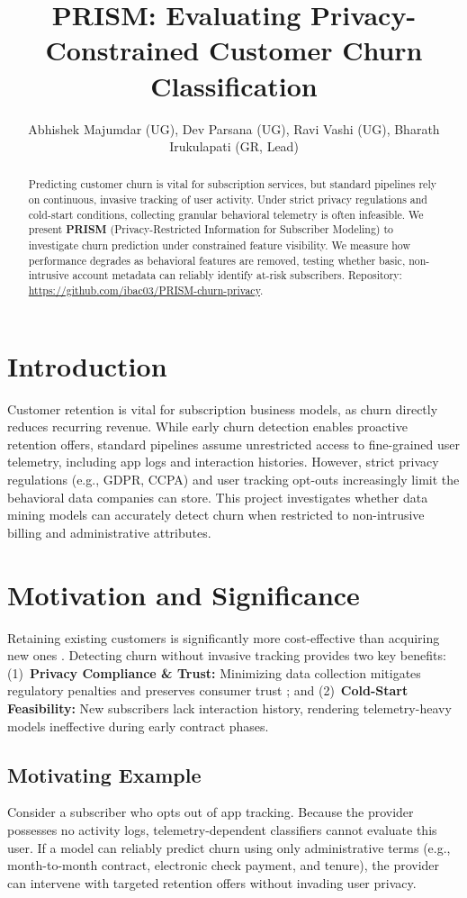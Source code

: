 \documentclass[sigconf,nonacm]{acmart}
\title{PRISM: Evaluating Privacy-Constrained Customer Churn Classification}
\author{Abhishek Majumdar (UG), Dev Parsana (UG), Ravi Vashi (UG), Bharath Irukulapati (GR, Lead)}
\affiliation{%
  \institution{Department of Computer Science, University of Victoria}
  \city{Victoria}
  \country{Canada}
}
\begin{document}
\begin{abstract}
Predicting customer churn is vital for subscription services, but standard pipelines rely on continuous, invasive tracking of user activity. Under strict privacy regulations and cold-start conditions, collecting granular behavioral telemetry is often infeasible. We present \textbf{PRISM} (Privacy-Restricted Information for Subscriber Modeling) to investigate churn prediction under constrained feature visibility. We measure how performance degrades as behavioral features are removed, testing whether basic, non-intrusive account metadata can reliably identify at-risk subscribers.
Repository: \url{https://github.com/ibac03/PRISM-churn-privacy}.
\end{abstract}

\maketitle

\section{Introduction}
Customer retention is vital for subscription business models, as churn directly reduces recurring revenue. While early churn detection enables proactive retention offers, standard pipelines assume unrestricted access to fine-grained user telemetry, including app logs and interaction histories. However, strict privacy regulations (e.g., GDPR, CCPA) and user tracking opt-outs increasingly limit the behavioral data companies can store. This project investigates whether data mining models can accurately detect churn when restricted to non-intrusive billing and administrative attributes.

\section{Motivation and Significance}
\label{sec:motivation}
Retaining existing customers is significantly more cost-effective than acquiring new ones \cite{gupta2005valuing}. Detecting churn without invasive tracking provides two key benefits:
(1)~\textbf{Privacy Compliance \& Trust:} Minimizing data collection mitigates regulatory penalties and preserves consumer trust \cite{martin2017data}; and
(2)~\textbf{Cold-Start Feasibility:} New subscribers lack interaction history, rendering telemetry-heavy models ineffective during early contract phases.

\subsection{Motivating Example}
Consider a subscriber who opts out of app tracking. Because the provider possesses no activity logs, telemetry-dependent classifiers cannot evaluate this user. If a model can reliably predict churn using only administrative terms (e.g., month-to-month contract, electronic check payment, and tenure), the provider can intervene with targeted retention offers without invading user privacy.
\end{document}
